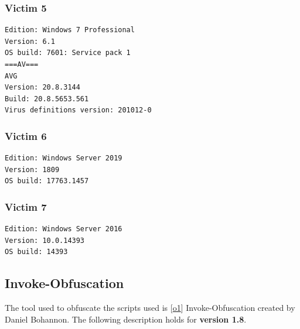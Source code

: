 \documentclass{article}%
\begin{document}
\subsubsection{Victim 5}
\begin{verbatim}
Edition: Windows 7 Professional
Version: 6.1
OS build: 7601: Service pack 1
===AV===
AVG
Version: 20.8.3144
Build: 20.8.5653.561
Virus definitions version: 201012-0
\end{verbatim}
\subsubsection{Victim 6}
\begin{verbatim}
Edition: Windows Server 2019
Version: 1809
OS build: 17763.1457
\end{verbatim}
\subsubsection{Victim 7}
\begin{verbatim}
Edition: Windows Server 2016
Version: 10.0.14393
OS build: 14393
\end{verbatim}
\subsection{Invoke-Obfuscation}
The tool used to obfuscate the scripts used is [\hyperlink{o1}{o1}] Invoke-Obfuscation created by Daniel Bohannon. The following description holds for \textbf{version 1.8}.
\end{document}
